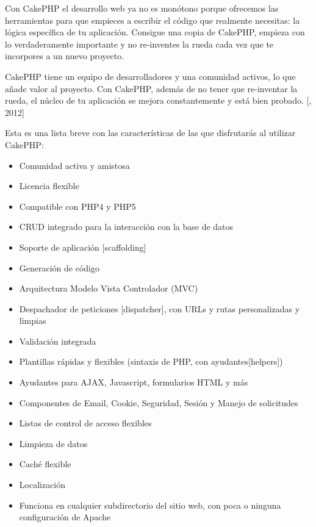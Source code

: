Con CakePHP el desarrollo web ya no es monótono porque ofrecemos las herramientas para que empieces a escribir el código que realmente necesitas: la lógica específica de tu aplicación. Consigue una copia de CakePHP, empieza con lo verdaderamente importante y no re-inventes la rueda cada vez que te incorpores a un nuevo proyecto.

CakePHP tiene un equipo de desarrolladores y una comunidad activos, lo que añade valor al proyecto. Con CakePHP, además de no tener que re-inventar la rueda, el núcleo de tu aplicación se mejora constantemente y está bien probado. [\citet{cakebib}, 2012]

Esta es una lista breve con las características de las que disfrutarás al utilizar CakePHP:
\setlength{\parskip}{0mm}
\begin{itemize}

	\item Comunidad activa y amistosa

    \item Licencia flexible
    
    \item Compatible con PHP4 y PHP5
    
    \item CRUD integrado para la interacción con la base de datos
    
    \item Soporte de aplicación [scaffolding]
    
    \item Generación de código
    
    \item Arquitectura Modelo Vista Controlador (MVC)
    
    \item Despachador de peticiones [dispatcher], con URLs y rutas personalizadas y limpias
    
    \item Validación integrada
    
    \item Plantillas rápidas y flexibles (sintaxis de PHP, con ayudantes[helpers])
    
    \item Ayudantes para AJAX, Javascript, formularios HTML y más
    
    \item Componentes de Email, Cookie, Seguridad, Sesión y Manejo de solicitudes
    
    \item Listas de control de acceso flexibles
    
    \item Limpieza de datos
    
    \item Caché flexible
    
    \item Localización
    
    \item Funciona en cualquier subdirectorio del sitio web, con poca o ninguna configuración de Apache

	
	
\end{itemize}

